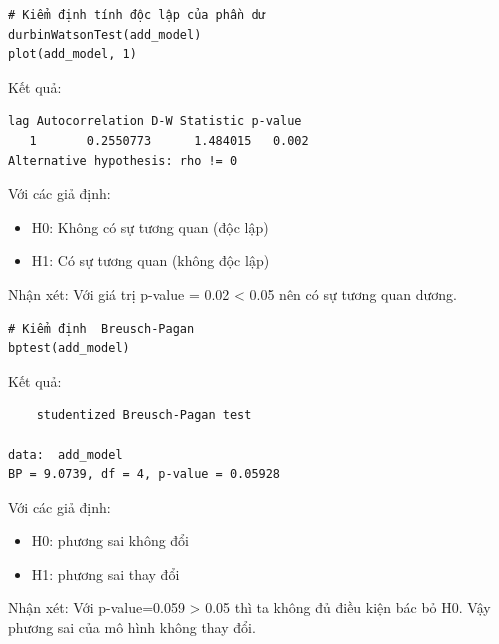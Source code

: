 \begin{lstlisting}
# Kiểm định tính độc lập của phần dư
durbinWatsonTest(add_model)
plot(add_model, 1)
\end{lstlisting}

Kết quả:
\begin{lstlisting}
lag Autocorrelation D-W Statistic p-value
   1       0.2550773      1.484015   0.002
Alternative hypothesis: rho != 0
\end{lstlisting}
Với các giả định:
    \begin{itemize}
        \item H0: Không có sự tương quan (độc lập)
        \item H1: Có sự tương quan (không độc lập)
    \end{itemize}
Nhận xét:  Với giá trị p-value = 0.02 < 0.05 nên có sự tương quan dương.

\begin{lstlisting}
# Kiểm định  Breusch-Pagan
bptest(add_model)
\end{lstlisting}
Kết quả:
\begin{lstlisting}
	studentized Breusch-Pagan test

data:  add_model
BP = 9.0739, df = 4, p-value = 0.05928
\end{lstlisting}
Với các giả định:
    \begin{itemize}
        \item H0: phương sai không đổi
        \item H1: phương sai thay đổi
    \end{itemize}
Nhận xét:  Với p-value=0.059 > 0.05 thì ta không đủ điều kiện bác bỏ H0. Vậy phương sai của mô hình không thay đổi.

